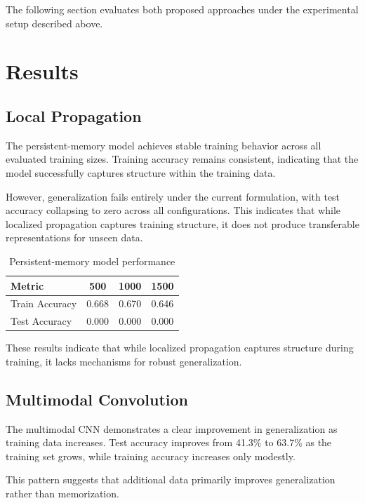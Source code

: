 \documentclass{article}
\begin{document}
The following section evaluates both proposed approaches under the experimental setup described above.
	
	\section{Results}
	
	\subsection{Local Propagation}
	
The persistent-memory model achieves stable training behavior across all evaluated training sizes. Training accuracy remains consistent, indicating that the model successfully captures structure within the training data.

However, generalization fails entirely under the current formulation, with test accuracy collapsing to zero across all configurations. This indicates that while localized propagation captures training structure, it does not produce transferable representations for unseen data.
	

	
	\begin{table}[h]
		\centering
		\begin{tabular}{lccc}
			\toprule
			Metric & 500 & 1000 & 1500 \\
			\midrule
			Train Accuracy & 0.668 & 0.670 & 0.646 \\
			Test Accuracy & 0.000 & 0.000 & 0.000 \\
			\bottomrule
		\end{tabular}
		\caption{Persistent-memory model performance}
	\end{table}
	
	These results indicate that while localized propagation captures structure during training, it lacks mechanisms for robust generalization.
	
	\subsection{Multimodal Convolution}
	
The multimodal CNN demonstrates a clear improvement in generalization as training data increases. Test accuracy improves from 41.3\% to 63.7\% as the training set grows, while training accuracy increases only modestly.

This pattern suggests that additional data primarily improves generalization rather than memorization.
	
\end{document}
